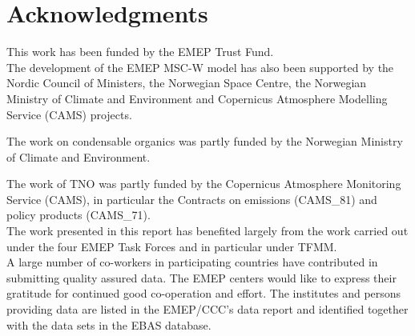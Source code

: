 \chapter*{Acknowledgments}

\enlargethispage{3\baselineskip}

\vspace{-2cm}


This work has been funded by the EMEP Trust Fund.\\

The development of the EMEP MSC-W model has also been supported by the Nordic Council of Ministers, the Norwegian Space Centre, the Norwegian Ministry of Climate and Environment and Copernicus Atmosphere Modelling Service (CAMS) projects.


The work on condensable organics was partly funded by the Norwegian Ministry of Climate and Environment. 


The work of TNO was partly funded
by the Copernicus Atmosphere Monitoring Service (CAMS),
in particular the Contracts on emissions (CAMS\_81) and policy products
(CAMS\_71).\\

The work presented in this report has benefited largely from the work carried out under the four EMEP Task Forces and in particular under TFMM.\\

A large number of co-workers in participating countries have contributed in submitting quality assured data. The EMEP centers would like to express their gratitude for continued good co-operation and effort. The institutes and persons providing data are listed in the EMEP/CCC's data report and identified together with the data sets in the EBAS database. \\


